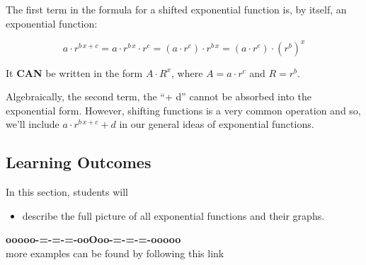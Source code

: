 \documentclass{ximera}
\begin{document}
The first term in the formula for a shifted exponential function is, by itself, an exponential function:

\[
a \cdot r^{b \, x + c} = a \cdot r^{b \, x} \cdot  r^c = (a \cdot r^c) \cdot r^{b \, x} = (a \cdot r^c) \cdot (r^b)^x 
\]

It \textbf{\textcolor{purple!85!blue}{CAN}} be written in the form $A \cdot R^x$, where $A = a \cdot r^c$ and $R = r^b$.


Algebraically, the second term, the ``+ d'' cannot be absorbed into the exponential form.  However, shifting functions is a very common operation and so, we'll include $a \cdot r^{b \, x + c} + d$ in our general ideas of exponential functions.





\subsection*{Learning Outcomes}


\begin{sectionOutcomes}
In this section, students will 

\begin{itemize}
\item describe the full picture of all exponential functions and their graphs.
\end{itemize}
\end{sectionOutcomes}












\begin{center}
\textbf{\textcolor{green!50!black}{ooooo-=-=-=-ooOoo-=-=-=-ooooo}} \\

more examples can be found by following this link\\ 

\end{center}
\end{document}

